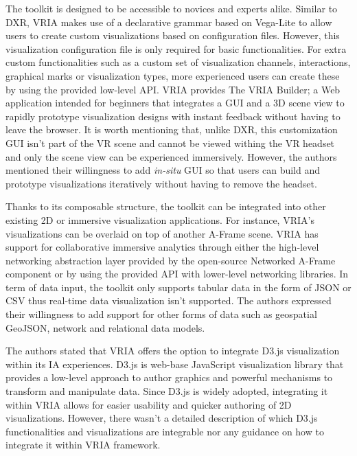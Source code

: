 \documentclass{vgtc}                          %
\begin{document}
\noindent The toolkit is designed to be accessible to novices and experts
alike. Similar to DXR, VRIA makes use of a declarative grammar based on
Vega-Lite to allow users to create custom visualizations based on configuration
files. However, this visualization configuration file is only required for
basic functionalities. For extra custom functionalities such as a custom set of
visualization channels, interactions, graphical marks or visualization types,
more experienced users can create these by using the provided low-level API.
VRIA provides The VRIA Builder; a Web application intended for beginners that
integrates a GUI and a 3D scene view to rapidly prototype visualization designs
with instant feedback without having to leave the browser. It is worth
mentioning that, unlike DXR, this customization GUI isn't part of the VR scene
and cannot be viewed withing the VR headset and only the scene view can be
experienced immersively. However, the authors mentioned their willingness to
add \textit{in-situ} GUI so that users can build and prototype visualizations
iteratively without having to remove the headset.

\smallskip

\noindent Thanks to its composable structure, the toolkit can be integrated into
other existing 2D or immersive visualization applications. For instance,
VRIA's visualizations can be overlaid on top of another A-Frame scene.
VRIA has support for collaborative immersive analytics through either the
high-level networking abstraction layer provided by the open-source Networked
A-Frame component or by using the provided API with lower-level networking
libraries.
In term of data input, the toolkit only supports tabular data in the form of
JSON or CSV thus real-time data visualization isn't supported. The authors
expressed their willingness to add support for other forms of data such as
geospatial GeoJSON, network and relational data models.

\smallskip

\noindent The authors stated that VRIA offers the option to integrate D3.js
visualization within its IA experiences. D3.js is web-base JavaScript
visualization library that provides a low-level approach to author graphics and
powerful mechanisms to transform and manipulate data. Since D3.js is widely
adopted, integrating it within VRIA allows for easier usability and quicker
authoring of 2D visualizations. However, there wasn't a detailed description of
which D3.js functionalities and visualizations are integrable nor any guidance
on how to integrate it within VRIA framework.
\end{document}
